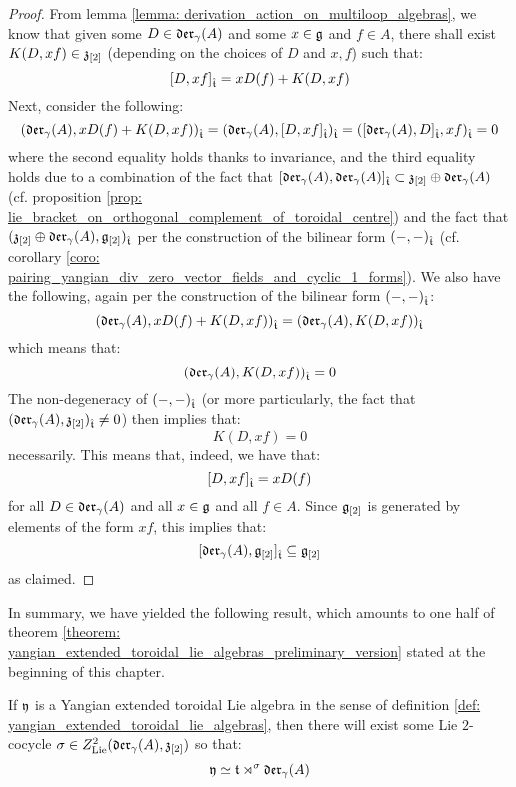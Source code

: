             \begin{proof}
                From lemma \ref{lemma: derivation_action_on_multiloop_algebras}, we know that given some $D \in \mathfrak{der}_{\gamma}(A)$ and some $x \in \mathfrak{g}$ and $f \in A$, there shall exist $K(D, xf) \in \mathfrak{z}_{[2]}$ (depending on the choices of $D$ and $x, f$) such that:
                    $$[D, xf]_{\hat{\mathfrak{t}}} = x D(f) + K(D, xf)$$
                Next, consider the following:
                    $$( \mathfrak{der}_{\gamma}(A), x D(f) + K(D, xf) )_{\hat{\mathfrak{t}}} = ( \mathfrak{der}_{\gamma}(A), [D, xf]_{\hat{\mathfrak{t}}} )_{\hat{\mathfrak{t}}} = ( [\mathfrak{der}_{\gamma}(A), D]_{\hat{\mathfrak{t}}}, xf )_{\hat{\mathfrak{t}}} = 0$$
                where the second equality holds thanks to invariance, and the third equality holds due to a combination of the fact that $[\mathfrak{der}_{\gamma}(A), \mathfrak{der}_{\gamma}(A)]_{\hat{\mathfrak{t}}} \subset \mathfrak{z}_{[2]} \oplus \mathfrak{der}_{\gamma}(A)$ (cf. proposition \ref{prop: lie_bracket_on_orthogonal_complement_of_toroidal_centre}) and the fact that $(\mathfrak{z}_{[2]} \oplus \mathfrak{der}_{\gamma}(A), \mathfrak{g}_{[2]})_{\hat{\mathfrak{t}}}$ per the construction of the bilinear form $(-, -)_{\hat{\mathfrak{t}}}$ (cf. corollary \ref{coro: pairing_yangian_div_zero_vector_fields_and_cyclic_1_forms}). We also have the following, again per the construction of the bilinear form $(-, -)_{\hat{\mathfrak{t}}}$:
                    $$( \mathfrak{der}_{\gamma}(A), x D(f) + K(D, xf) )_{\hat{\mathfrak{t}}} = ( \mathfrak{der}_{\gamma}(A), K(D, xf) )_{\hat{\mathfrak{t}}}$$
                which means that:
                    $$( \mathfrak{der}_{\gamma}(A), K(D, xf) )_{\hat{\mathfrak{t}}} = 0$$
                The non-degeneracy of $(-, -)_{\hat{\mathfrak{t}}}$ (or more particularly, the fact that $( \mathfrak{der}_{\gamma}(A), \mathfrak{z}_{[2]} )_{\hat{\mathfrak{t}}} \not = 0$) then implies that:
                    $$K(D, xf) = 0$$
                necessarily. This means that, indeed, we have that:
                    $$[D, xf]_{\hat{\mathfrak{t}}} = x D(f)$$
                for all $D \in \mathfrak{der}_{\gamma}(A)$ and all $x \in \mathfrak{g}$ and all $f \in A$. Since $\mathfrak{g}_{[2]}$ is generated by elements of the form $xf$, this implies that:
                    $$[\mathfrak{der}_{\gamma}(A), \mathfrak{g}_{[2]}]_{\hat{\mathfrak{t}}} \subseteq \mathfrak{g}_{[2]}$$
                as claimed. 
            \end{proof}
        
        In summary, we have yielded the following result, which amounts to one half of theorem \ref{theorem: yangian_extended_toroidal_lie_algebras_preliminary_version} stated at the beginning of this chapter.
        \begin{theorem} \label{theorem: yangian_extended_toroidal_lie_algebras}
            If $\mathfrak{y}$ is a Yangian extended toroidal Lie algebra in the sense of definition \ref{def: yangian_extended_toroidal_lie_algebras}, then there will exist some Lie $2$-cocycle $\sigma \in Z^2_{\mathrm{Lie}}(\mathfrak{der}_{\gamma}(A), \mathfrak{z}_{[2]})$ so that:
                $$\mathfrak{y} \simeq \mathfrak{t} \rtimes^{\sigma} \mathfrak{der}_{\gamma}(A)$$
        \end{theorem}


